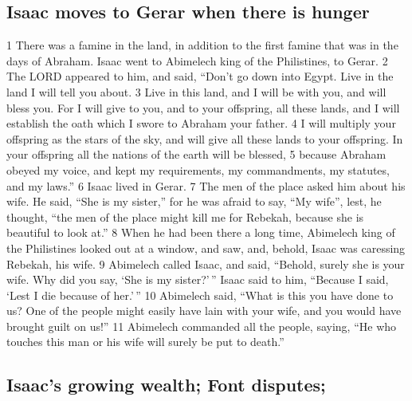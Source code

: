 \hypertarget{isaac-moves-to-gerar-when-there-is-hunger}{%
\subsection{Isaac moves to Gerar when there is
hunger}\label{isaac-moves-to-gerar-when-there-is-hunger}}

{1} There was a famine in the land, in addition to the first famine that
was in the days of Abraham. Isaac went to Abimelech king of the
Philistines, to Gerar. {2} The LORD appeared to him, and said, ``Don't
go down into Egypt. Live in the land I will tell you about. {3} Live in
this land, and I will be with you, and will bless you. For I will give
to you, and to your offspring, all these lands, and I will establish the
oath which I swore to Abraham your father. {4} I will multiply your
offspring as the stars of the sky, and will give all these lands to your
offspring. In your offspring all the nations of the earth will be
blessed, {5} because Abraham obeyed my voice, and kept my requirements,
my commandments, my statutes, and my laws.'' {6} Isaac lived in Gerar.
{7} The men of the place asked him about his wife. He said, ``She is my
sister,'' for he was afraid to say, ``My wife'', lest, he thought, ``the
men of the place might kill me for Rebekah, because she is beautiful to
look at.'' {8} When he had been there a long time, Abimelech king of the
Philistines looked out at a window, and saw, and, behold, Isaac was
caressing Rebekah, his wife. {9} Abimelech called Isaac, and said,
``Behold, surely she is your wife. Why did you say, `She is my
sister?'\,'' Isaac said to him, ``Because I said, `Lest I die because of
her.'\,'' {10} Abimelech said, ``What is this you have done to us? One
of the people might easily have lain with your wife, and you would have
brought guilt on us!'' {11} Abimelech commanded all the people, saying,
``He who touches this man or his wife will surely be put to death.''

\hypertarget{isaacs-growing-wealth-font-disputes}{%
\subsection{Isaac's growing wealth; Font
disputes;}\label{isaacs-growing-wealth-font-disputes}}

